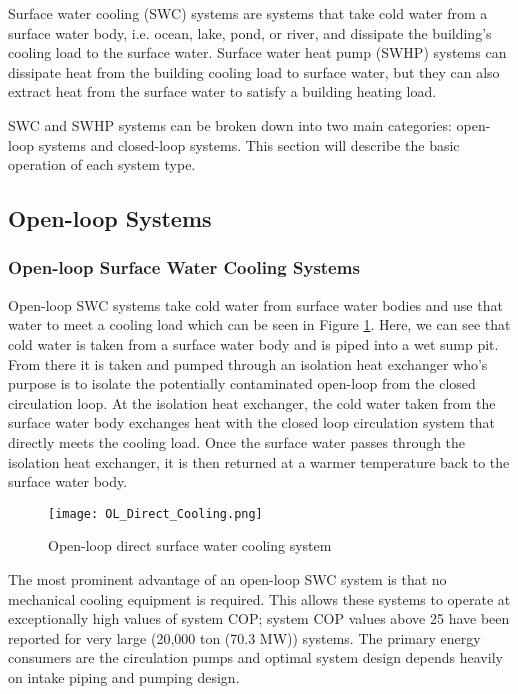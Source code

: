 Surface water cooling (SWC) systems are systems that take cold water from a surface water body, i.e. ocean, lake, pond, or river, and dissipate the building's cooling load to the surface water. Surface water heat pump (SWHP) systems can dissipate heat from the building cooling load to surface water, but they can also extract heat from the surface water to satisfy a building heating load.

SWC and SWHP systems can be broken down into two main categories: open-loop systems and closed-loop systems. This section will describe the basic operation of each system type.
	
	\subsection{Open-loop Systems}
	\label{subsec:Intro:SystemOverview:OpenLoop}

		\subsubsection{Open-loop Surface Water Cooling Systems}
		
Open-loop SWC systems take cold water from surface water bodies and use that water to meet a cooling load which can be seen in Figure \ref{fig:Intro:SystemOverview:OpenLoop:OLDirectCooling}. Here, we can see that cold water is taken from a surface water body and is piped into a wet sump pit. From there it is taken and pumped through an isolation heat exchanger who's purpose is to isolate the potentially contaminated open-loop from the closed circulation loop. At the isolation heat exchanger, the cold water taken from the surface water body exchanges heat with the closed loop circulation system that directly meets the cooling load. Once the surface water passes through the isolation heat exchanger, it is then returned at a warmer temperature back to the surface water body.

	\begin{figure}
		\centering
		\texttt{[image: OL\_Direct\_Cooling.png]}
		\caption[Open-loop direct surface water cooling system]{Open-loop direct surface water cooling system}
		\label{fig:Intro:SystemOverview:OpenLoop:OLDirectCooling}
	\end{figure}

The most prominent advantage of an open-loop SWC system is that no mechanical cooling equipment is required. This allows these systems to operate at exceptionally high values of system COP; system COP values above 25 have been reported \citep{Peer2012} for very large (20,000 ton (70.3 MW)) systems. The primary energy consumers are the circulation pumps and optimal system design depends heavily on intake piping and pumping design.

